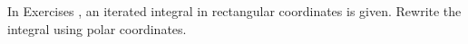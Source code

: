 {\noindent In Exercises}
{, an iterated integral in rectangular coordinates is given. Rewrite the integral using polar coordinates.}
